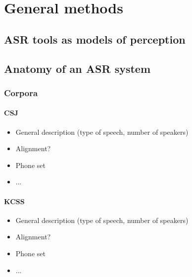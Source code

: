 








\section{General methods}
\subsection{ASR tools as models of perception}

\subsection{Anatomy of an ASR system}

\subsubsection{Corpora}
\paragraph{CSJ}
\begin{itemize}
\item General description (type of speech, number of speakers)
\item Alignment?
\item Phone set
\item ...
\end{itemize}

\paragraph{KCSS}
\begin{itemize}
\item General description (type of speech, number of speakers)
\item Alignment?
\item Phone set
\item ...
\end{itemize}

